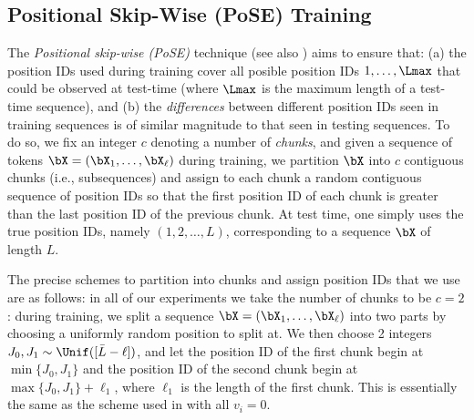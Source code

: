 \subsection{Positional Skip-Wise (PoSE) Training}
\label{sec:prelim-pose}
The \emph{Positional skip-wise (PoSE)} technique \cite{zhu_pose_2024} (see also \cite{wu_never_2024}) aims to ensure that: %
(a) the position IDs used during training cover all posible  position IDs $1, \ldots, \Lmax$ that could be observed at test-time (where $\Lmax$ is the maximum length of a test-time sequence), and (b) the \emph{differences} between different position IDs seen in training sequences is of similar magnitude to that seen in testing sequences. To do so, we fix an integer $c$ denoting a number of \emph{chunks}, and given a sequence of tokens $\bX = (\bX_1, \ldots, \bX_\ell)$ during training, we partition $\bX$ into $c$ contiguous chunks (i.e., subsequences) and assign to each chunk a random contiguous sequence of position IDs so that the first position ID of each chunk is greater than the last position ID of the previous chunk. %
{At test  time, one simply uses the true position IDs, namely $(1, 2, \ldots, L)$, corresponding to a sequence $\bX$ of length $L$. }

The precise schemes to partition into chunks and assign position IDs that we use are as follows: in all of our experiments we take the number of chunks to be $c = 2$: during training, we split a sequence $\bX = (\bX_1, \ldots, \bX_\ell)$ into two parts by choosing a uniformly random position to split at. We then choose 2 integers $J_0, J_1 \sim \Unif([\bar L - \ell])$, and let the position ID of the first chunk begin at $\min\{J_0, J_1 \}$ and the position ID of the second chunk begin at $\max\{J_0, J_1 \} + \ell_1$, where $\ell_1$ is the length of the first chunk. This is essentially the same as the scheme used in \citet{zhu_pose_2024} with all $v_i = 0$. %


